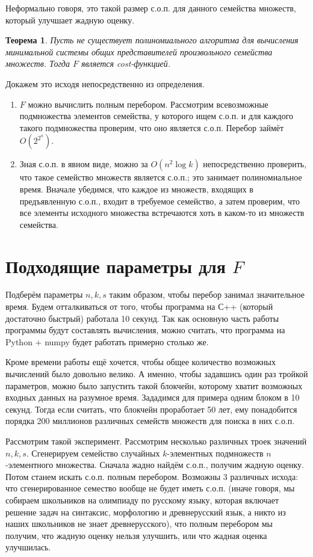 \documentclass{article}
\newtheorem*{theorem}{Теорема}
\begin{document}
    Неформально говоря, это такой размер с.о.п. для данного семейства множеств, который улучшает жадную оценку.


\begin{theorem}
    Пусть не существует полиномиального алгоритма для вычисления минимальной системы общих представителей произвольного семейства множеств. Тогда $F$ является cost-функцией. 
\end{theorem}

Докажем это исходя непосредственно из определения.
\begin{enumerate}
\item $F$ можно вычислить полным перебором. Рассмотрим всевозможные подмножества элементов семейства, у которого ищем с.о.п. и для каждого такого подмножества проверим, что оно является с.о.п. Перебор займёт $O(2^{2^n})$. 
\item Зная с.о.п. в явном виде, можно за $O(n^2 \log k)$ непосредственно проверить, что такое семейство множеств является с.о.п.; это занимает полиномиальное время. Вначале убедимся, что каждое из множеств, входящих в предъявленную с.о.п., входит в требуемое семейство, а затем проверим, что все элементы исходного множества встречаются хоть в каком-то из множеств семейства.
\end{enumerate}

\section{Подходящие параметры для $F$}

    Подберём параметры $n, k, s$ таким образом, чтобы перебор занимал значительное время. Будем отталкиваться от того, чтобы программа на С++ (который достаточно быстрый) работала 10 секунд. Так как основную часть работы программы будут составлять вычисления, можно считать, что программа на Python + numpy будет работать примерно столько же.

    Кроме времени работы ещё хочется, чтобы общее количество возможных вычислений было довольно велико. А именно, чтобы задавшись один раз тройкой параметров, можно было запустить такой блокчейн, которому хватит возможных входных данных на разумное время. Зададимся для примера одним блоком в 10 секунд. Тогда если считать, что блокчейн проработает 50 лет, ему понадобится порядка 200 миллионов различных семейств множеств для поиска в них с.о.п.

    Рассмотрим такой эксперимент. Рассмотрим несколько различных троек значений $n, k, s$. Сгенерируем семейство случайных $k$-элементных подмножеств $n$-элементного множества. Сначала жадно найдём с.о.п., получим жадную оценку. Потом станем искать с.о.п. полным перебором. Возможны 3 различных исхода: что сгенерированное семество вообще не будет иметь с.о.п. (иначе говоря, мы собираем школьников на олимпиаду по русскому языку, которая включает решение задач на синтаксис, морфологию и древнерусский язык, а никто из наших школьников не знает древнерусского), что полным перебором мы получим, что жадную оценку нельзя улучшить, или что жадная оценка улучшилась.
\end{document}
